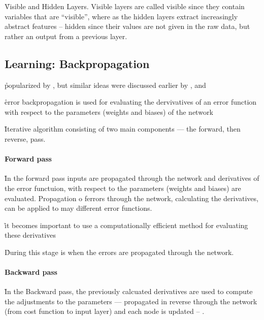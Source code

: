 \r{Visible and Hidden Layers. Visible layers are called visible since they contain variables that are ``visible'', where as the hidden layers extract increasingly abstract features -- hidden since their values are not given in the raw data, but rather an output from a previous layer.}



\subsection{Learning: Backpropagation}


\r{popularized by , but similar ideas were discussed earlier by , and }

\r{error backpropagation is used for evaluating the dervivatives of an error function with respect to the parameters (weights and biases) of the network}

\r{Iterative algorithm consisting of two main components --- the forward, then reverse, pass.}



\paragraph{Forward pass}

\r{In the forward pass inputs are propagated through the network and derivatives of the error functuion, with respect to the parameters (weights and biases) are evaluated. Propagation o ferrors through the network, calculating the derivatives, can be applied to may different error functions.}

\r{it becomes important to use a computationally efficient method for evaluating these derivatives }

\r{During this stage is when the errors are propagated through the network.}

\paragraph{Backward pass}

\r{In the Backward pass, the previously calcuated derivatives are used to compute the adjustments to the parameters --- propagated in reverse through the network (from cost function to input layer) and each node is updated -- .}

